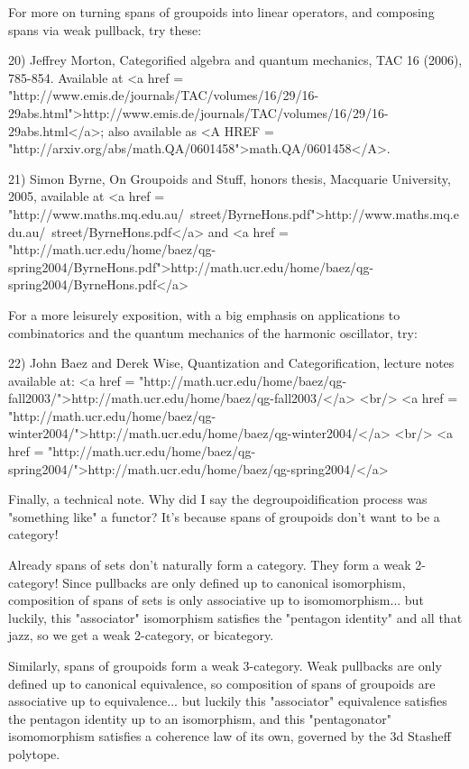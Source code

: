 For more on turning spans of groupoids into linear operators, and
composing spans via weak pullback, try these:

20) Jeffrey Morton, Categorified algebra and quantum mechanics, 
TAC 16 (2006), 785-854.  Available at 
<a href = "http://www.emis.de/journals/TAC/volumes/16/29/16-29abs.html">http://www.emis.de/journals/TAC/volumes/16/29/16-29abs.html</a>; 
also available as <A HREF = "http://arxiv.org/abs/math.QA/0601458">math.QA/0601458</A>.

21) Simon Byrne, On Groupoids and Stuff, honors thesis, Macquarie 
University, 2005, available at 
<a href = "http://www.maths.mq.edu.au/~street/ByrneHons.pdf">http://www.maths.mq.edu.au/~street/ByrneHons.pdf</a> and 
<a href = "http://math.ucr.edu/home/baez/qg-spring2004/ByrneHons.pdf">http://math.ucr.edu/home/baez/qg-spring2004/ByrneHons.pdf</a>

For a more leisurely exposition, with a big emphasis on applications
to combinatorics and the quantum mechanics of the harmonic oscillator,
try:

22) John Baez and Derek Wise, Quantization and Categorification, 
lecture notes available at: 
<a href = "http://math.ucr.edu/home/baez/qg-fall2003/">http://math.ucr.edu/home/baez/qg-fall2003/</a> <br/>
<a href = "http://math.ucr.edu/home/baez/qg-winter2004/">http://math.ucr.edu/home/baez/qg-winter2004/</a> <br/>
<a href = "http://math.ucr.edu/home/baez/qg-spring2004/">http://math.ucr.edu/home/baez/qg-spring2004/</a>

Finally, a technical note.  Why did I say the degroupoidification
process was "something like" a functor?  It's because spans of 
groupoids don't want to be a category!  

Already spans of sets don't naturally form a category.  They form a 
weak 2-category!   Since pullbacks are only defined up to canonical 
isomorphism, composition of spans of sets is only associative 
up to isomomorphism... but luckily, this "associator" isomorphism 
satisfies the "pentagon identity" and all that jazz, so we get a 
weak 2-category, or bicategory.

Similarly, spans of groupoids form a weak 3-category.  Weak pullbacks
are only defined up to canonical equivalence, so composition of spans
of groupoids are associative up to equivalence... but luckily this
"associator" equivalence satisfies the pentagon identity up to an
isomorphism, and this "pentagonator" isomomorphism satisfies a 
coherence law of its own, governed by the 3d Stasheff polytope.

